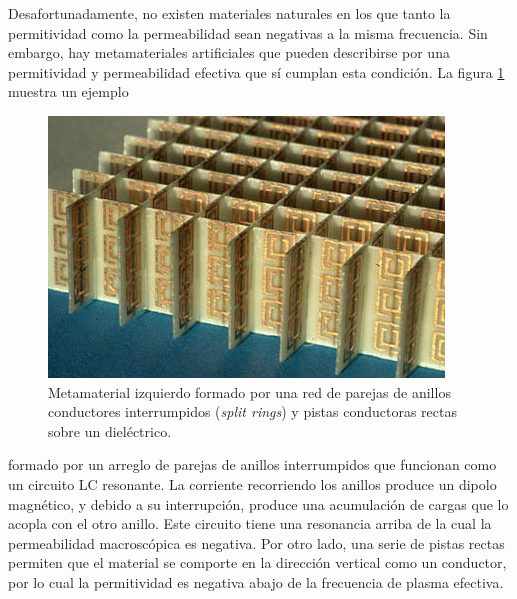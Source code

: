 \documentclass[12pt]{article}
\begin{document}
Desafortunadamente, no existen materiales naturales en los que tanto
la permitividad como la permeabilidad sean negativas a la misma
frecuencia. Sin embargo, hay metamateriales artificiales que pueden
describirse por una permitividad y permeabilidad efectiva que sí
cumplan esta condición. La figura \ref{fig:rings} muestra un ejemplo
\begin{figure}
  \centering
  \includegraphics[width=.7\textwidth]{fig11}
  \caption{Metamaterial izquierdo formado por una red de parejas de
    anillos conductores interrumpidos ({\em split rings}) y pistas
    conductoras rectas sobre un dieléctrico. }
  \label{fig:rings}
\end{figure}
formado por un arreglo de parejas de anillos interrumpidos que
funcionan como un circuito LC resonante. La corriente recorriendo los
anillos produce un dipolo magnético, y debido a su interrupción,
produce una acumulación de cargas que lo acopla con el otro
anillo. Este circuito tiene una resonancia arriba de la cual la
permeabilidad macroscópica es negativa. Por otro lado, una serie de
pistas rectas permiten que el material se comporte en la dirección
vertical como un conductor, por lo cual la permitividad es negativa
abajo de la frecuencia de plasma efectiva.
\end{document}
